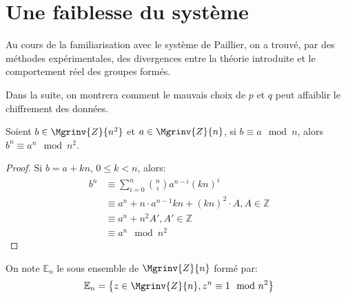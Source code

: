 	\section{Une faiblesse du système}
		Au cours de la familiarisation avec le système de Paillier, on a trouvé, par des méthodes expérimentales, 
		des divergences entre la théorie introduite et le comportement réel des groupes formés. 

		Dans la suite, on montrera comment le mauvais choix de $p$ et $q$ peut affaiblir le chiffrement des données. 
		
		\begin{lemma}{Soient $b \in \Mgrinv{Z}{n^2}$ et $a \in \Mgrinv{Z}{n}$, si $b \equiv a \mod{n}$, alors $b^n \equiv a^n \mod{n^2}$.} 
			\label{lemma:equivncarre}
			\begin{proof}
			Si $b = a+kn$, $0 \leq k < n$, alors:
			\begin{align}
			b^n &\equiv  \sum_{i = 0}^{n}\binom{n}{i} a^{n-i} (kn)^{i}  \nonumber\\
				    &\equiv  a^n+n\cdot a^{n-1}kn +(kn)^2\cdot A, A\in \mathbb{Z}\nonumber\\
			            &\equiv  a^n+n^2A' , A'\in \mathbb{Z}\nonumber\\
				    &\equiv  a^n \mod{n^2}
			\end{align}
			
			\end{proof}
		\end{lemma}
		\begin{definition} On note ${\mathbb E}_n$ le sous ensemble de $\Mgrinv{Z}{n}$ formé par:
			\begin{equation}
				\mathbb{E}_n = \left\{z \in \Mgrinv{Z}{n}, z^n \equiv 1 \mod{n^2} \right\}
			\end{equation}
		\end{definition}
		
